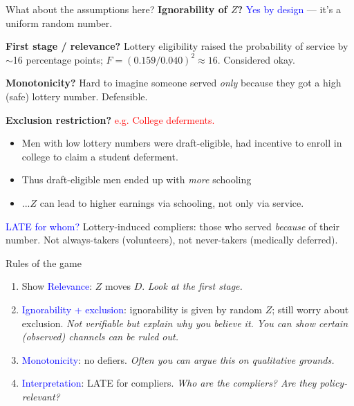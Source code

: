 \documentclass[xcolor=dvipsnames]{beamer}
\begin{document}
\begin{frame}{What about the assumptions here?}
\small
\textbf{Ignorability of $Z$?}  \textcolor{Blue}{Yes by design} --- it's a uniform random number.
\bigskip

\textbf{First stage / relevance?}  Lottery eligibility raised the probability of service by $\sim$16 percentage points; $F = (0.159/0.040)^2 \approx 16$. Considered okay. 
\bigskip

\textbf{Monotonicity?}  Hard to imagine someone served \textit{only} because they got a high (safe) lottery number. Defensible.
\bigskip

\textbf{Exclusion restriction?}  \textcolor{Red}{e.g. College deferments.}
\begin{itemize}
\item Men with low lottery numbers were draft-eligible, had incentive to enroll in college to claim a student deferment.
\item Thus draft-eligible men ended up with \textit{more} schooling
\item ...$Z$ can lead to higher earnings via schooling, not only via service.
\end{itemize} 

\bigskip

\textcolor{Blue}{LATE for whom?} \footnotesize {} Lottery-induced compliers: those who served \textit{because} of their number. Not always-takers (volunteers), not never-takers (medically deferred).
\end{frame}

\begin{frame}{Rules of the game}
\begin{enumerate}
\item Show \textcolor{Blue}{Relevance}: $Z$ moves $D$. \textit{Look at the first stage.}
\medskip
\item \textcolor{Blue}{Ignorability + exclusion}: ignorability is given by random $Z$; still worry about exclusion. \textit{Not verifiable but explain why you believe it. You can show certain (observed) channels can be ruled out.}
\medskip
\item \textcolor{Blue}{Monotonicity}: no defiers. \textit{Often you can argue this on qualitative grounds.}
\medskip
\item \textcolor{Blue}{Interpretation}: LATE for compliers. \textit{Who are the compliers? Are they policy-relevant?}
\end{enumerate}
\end{frame}
\end{document}
